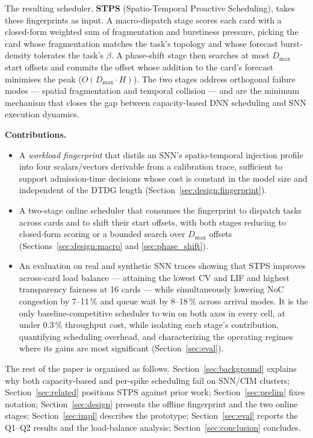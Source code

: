 \documentclass[letterpaper,twocolumn,10pt]{article}
\begin{document}
The resulting scheduler, \textbf{STPS} (Spatio-Temporal Proactive Scheduling), takes these fingerprints as input. A macro-dispatch stage scores each card with a closed-form weighted sum of fragmentation and burstiness pressure, picking the card whose fragmentation matches the task's topology and whose forecast burst-density tolerates the task's $\beta$. A phase-shift stage then searches at most $D_{\max}$ start offsets and commits the offset whose addition to the card's forecast minimises the peak ($O(D_{\max}\!\cdot\!H)$). The two stages address orthogonal failure modes --- spatial fragmentation and temporal collision --- and are the minimum mechanism that closes the gap between capacity-based DNN scheduling and SNN execution dynamics.

\medskip
\noindent\textbf{Contributions.}
\begin{itemize}
    \item A \emph{workload fingerprint} that distils an SNN's spatio-temporal injection profile into four scalars/vectors derivable from a calibration trace, sufficient to support admission-time decisions whose cost is constant in the model size and independent of the DTDG length (Section~\ref{sec:design:fingerprint}).
    \item A two-stage online scheduler that consumes the fingerprint to dispatch tasks across cards and to shift their start offsets, with both stages reducing to closed-form scoring or a bounded search over $D_{\max}$ offsets (Sections~\ref{sec:design:macro} and \ref{sec:phase_shift}).
    \item An evaluation on real and synthetic SNN traces showing that STPS improves across-card load balance --- attaining the lowest CV and LIF and highest transparency fairness at 16 cards --- while simultaneously lowering NoC congestion by 7--11\,\% and queue wait by 8--18\,\% across arrival modes. It is the only baseline-competitive scheduler to win on both axes in every cell, at under 0.3\,\% throughput cost, while isolating each stage's contribution, quantifying scheduling overhead, and characterizing the operating regimes where its gains are most significant (Section~\ref{sec:eval}).
\end{itemize}

The rest of the paper is organised as follows. Section~\ref{sec:background} explains why both capacity-based and per-spike scheduling fail on SNN/CIM clusters; Section~\ref{sec:related} positions STPS against prior work; Section~\ref{sec:prelim} fixes notation; Section~\ref{sec:design} presents the offline fingerprint and the two online stages; Section~\ref{sec:impl} describes the prototype; Section~\ref{sec:eval} reports the Q1--Q2 results and the load-balance analysis; Section~\ref{sec:conclusion} concludes.
\end{document}
